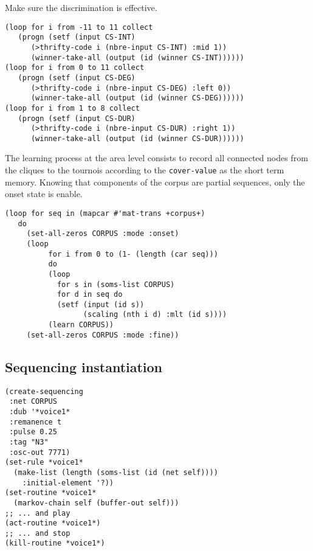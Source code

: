 Make sure the discrimination is effective. 
\begin{lstlisting}[language=N3]
(loop for i from -11 to 11 collect 
   (progn (setf (input CS-INT) 
      (>thrifty-code i (nbre-input CS-INT) :mid 1)) 
      (winner-take-all (output (id (winner CS-INT))))))
(loop for i from 0 to 11 collect 
   (progn (setf (input CS-DEG) 
      (>thrifty-code i (nbre-input CS-DEG) :left 0)) 
      (winner-take-all (output (id (winner CS-DEG))))))
(loop for i from 1 to 8 collect 
   (progn (setf (input CS-DUR) 
      (>thrifty-code i (nbre-input CS-DUR) :right 1)) 
      (winner-take-all (output (id (winner CS-DUR))))))
\end{lstlisting}
The learning process at the area level consists to record all connected nodes from the cliques to the tournois according to the \texttt{cover-value} as the short term memory. Knowing that components of the corpus are partial sequences, only the onset state is enable.
\begin{lstlisting}[language=N3]
(loop for seq in (mapcar #'mat-trans +corpus+)
   do     
     (set-all-zeros CORPUS :mode :onset)  
     (loop
	      for i from 0 to (1- (length (car seq))) 
	      do
	      (loop
	        for s in (soms-list CORPUS)
	        for d in seq do
	        (setf (input (id s)) 
	              (scaling (nth i d) :mlt (id s))))
	      (learn CORPUS))
     (set-all-zeros CORPUS :mode :fine))
\end{lstlisting}

\subsection{Sequencing instantiation}

\begin{lstlisting}[language=N3]
(create-sequencing
 :net CORPUS
 :dub '*voice1*
 :remanence t
 :pulse 0.25
 :tag "N3"
 :osc-out 7771)
(set-rule *voice1* 
  (make-list (length (soms-list (id (net self)))) 
    :initial-element '?))
(set-routine *voice1* 
  (markov-chain self (buffer-out self)))
;; ... and play
(act-routine *voice1*)
;; ... and stop
(kill-routine *voice1*)
\end{lstlisting}

